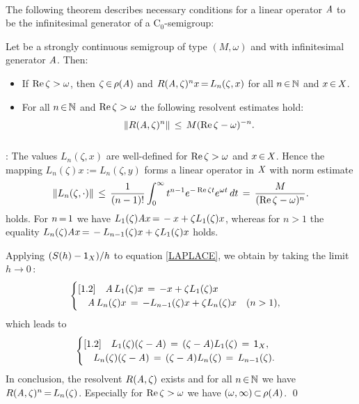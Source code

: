 \documentclass[11pt,twoside]{article}
\begin{document}
\paragraph{}
The following theorem describes necessary conditions for a linear operator
$\mathit{A}$ to be the infinitesimal generator of a C$_0$-semigroup:

\begin{theorem}
Let {\SG} be a strongly continuous semigroup of type $(M,\omega)$
and with infinitesimal generator $\mathit{A}$. Then:

\begin{itemize}[leftmargin=15pt]
\item[(a)]
If $\operatorname{Re} \zeta > \omega$,
then $\zeta {\,\in\,} \rho(\mathit{A})$ and $R(\mathit{A},\zeta)^nx {\,=\,} L_n(\zeta,x)$
for all $n {\,\in\,} {\mathbb{N}}$ and $x {\,\in\,} \mathit{X}$.

\item[(b)]
For all $n {\,\in\,} {\mathbb{N}}$ and $\operatorname{Re} \zeta > \omega$
the following resolvent estimates hold:
\[
\left\lVert R(\mathit{A},\zeta)^n \right\rVert \, \leq \, M (\operatorname{Re} \zeta - \omega)^{-n}.
\]
\end{itemize}
\end{theorem}

\subparagraph{}
\Proof:
The values $L_n(\zeta,x)$ are well-defined for $\operatorname{Re} \zeta > \omega$
and $x {\,\in\,} \mathit{X}$.
Hence the mapping $L_n(\zeta)x := L_n(\zeta,y)$ forms a linear operator
in $\mathit{X}$ with norm estimate
\[
\left\lVert L_n(\zeta,\cdot) \right\rVert
\, \leq \,
\frac{1}{(n-1)!} \int_0^{\infty} t^{n-1} e^{-\operatorname{Re} \zeta t}e^{\omega t}\,dt
\,=\, \frac{M}{(\operatorname{Re} \zeta - \omega)^n}.
\]
holds.
For $n {\,=\,} 1$ we have $L_1(\zeta)\mathit{A} x {\,=\,} -x + \zeta L_1(\zeta) x$,
whereas for $n > 1$ the equality
$L_n(\zeta)\mathit{A} x {\,=\,} -L_{n-1}(\zeta)x + \zeta L_1(\zeta)x$ holds.

Applying $(S(h)-{\mathsf{1}}_X)/h$ to equation \eqref{LAPLACE},
we obtain by taking the limit $h \to 0$\,:
\[
\begin{cases}[1.2]
\quad \mathit{A}\,L_1(\zeta)x \,=\, -x + \zeta L_1(\zeta)x\\
\quad \mathit{A}\,L_n(\zeta)x \,=\, -L_{n-1}(\zeta)x + \zeta L_n(\zeta)x \quad (n>1),\\
\end{cases}
\]
which leads to
\[
\begin{cases}[1.2]
\quad L_1(\zeta)(\zeta-\mathit{A}) \,=\, (\zeta-\mathit{A})L_1(\zeta) \,=\, {\mathsf{1}}_X,\\
\quad L_n(\zeta)(\zeta-\mathit{A}) \,=\, (\zeta-\mathit{A})L_n(\zeta) \,=\, L_{n-1}(\zeta).\\
\end{cases}
\]
In conclusion,
the resolvent $R(\mathit{A},\zeta)$ exists and for all $n {\,\in\,} {\mathbb{N}}$
we have $R(\mathit{A},\zeta)^n {\,=\,} L_n(\zeta)$.
Especially for $\operatorname{Re} \zeta > \omega$
we have $(\omega,\infty) {\,\subset\,} \rho(\mathit{A})$.
\qed
\end{document}
